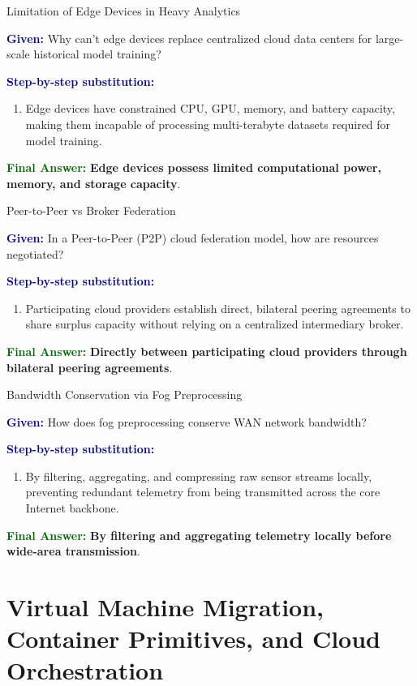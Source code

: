 \documentclass[11pt,a4paper,openany]{report}
\newcommand{\Given}{\par\textbf{\textcolor{navy}{Given:}} }
\newcommand{\Steps}{\par\textbf{\textcolor{navy}{Step-by-step substitution:}}\par}
\newcommand{\Answer}{\par\textbf{\textcolor{darkgreen}{Final Answer:}} }
\begin{document}
\begin{solved}{Limitation of Edge Devices in Heavy Analytics}
\Given Why can't edge devices replace centralized cloud data centers for large-scale historical model training?
\Steps
\begin{enumerate}[leftmargin=*]
  \item Edge devices have constrained CPU, GPU, memory, and battery capacity, making them incapable of processing multi-terabyte datasets required for model training.
\end{enumerate}
\Answer \textbf{Edge devices possess limited computational power, memory, and storage capacity}.
\end{solved}

\begin{solved}{Peer-to-Peer vs Broker Federation}
\Given In a Peer-to-Peer (P2P) cloud federation model, how are resources negotiated?
\Steps
\begin{enumerate}[leftmargin=*]
  \item Participating cloud providers establish direct, bilateral peering agreements to share surplus capacity without relying on a centralized intermediary broker.
\end{enumerate}
\Answer \textbf{Directly between participating cloud providers through bilateral peering agreements}.
\end{solved}

\begin{solved}{Bandwidth Conservation via Fog Preprocessing}
\Given How does fog preprocessing conserve WAN network bandwidth?
\Steps
\begin{enumerate}[leftmargin=*]
  \item By filtering, aggregating, and compressing raw sensor streams locally, preventing redundant telemetry from being transmitted across the core Internet backbone.
\end{enumerate}
\Answer \textbf{By filtering and aggregating telemetry locally before wide-area transmission}.
\end{solved}

\chapter{Virtual Machine Migration, Container Primitives, and Cloud Orchestration}
\end{document}
